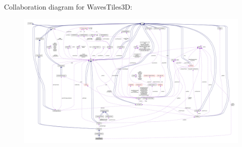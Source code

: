 Collaboration diagram for Waves\+Tiles3D\+:
\nopagebreak
\begin{figure}[H]
\begin{center}
\leavevmode
\includegraphics[width=350pt]{classWavesTiles3D__coll__graph}
\end{center}
\end{figure}
